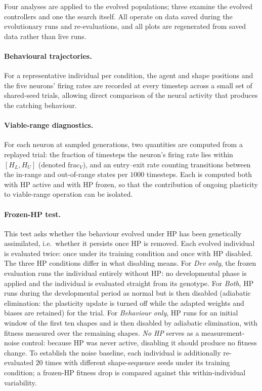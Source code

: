 Four analyses are applied to the evolved populations; three examine the evolved
controllers and one the search itself. All operate on data saved during the
evolutionary runs and re-evaluations, and all plots are regenerated from saved
data rather than live runs.

\paragraph{Behavioural trajectories.}
For a representative individual per condition, the agent and shape positions and
the five neurons' firing rates are recorded at every timestep across a small set
of shared-seed trials, allowing direct comparison of the neural activity that
produces the catching behaviour.

\paragraph{Viable-range diagnostics.}
For each neuron at sampled generations, two quantities are computed from a
replayed trial: the fraction of timesteps the neuron's firing rate lies within
$[H_L, H_U]$ (denoted $\mathrm{frac}_V$), and an entry--exit rate counting
transitions between the in-range and out-of-range states per $1000$ timesteps.
Each is computed both with HP active and with HP frozen, so that the
contribution of ongoing plasticity to viable-range operation can be isolated.

\paragraph{Frozen-HP test.}
This test asks whether the behaviour evolved under HP has been genetically
assimilated, i.e.\ whether it persists once HP is removed. Each evolved
individual is evaluated twice: once under its training condition and once with HP
disabled. The three HP conditions differ in what disabling means. For
\emph{Dev only}, the frozen evaluation runs the individual entirely without HP:
no developmental phase is applied and the individual is evaluated straight from
its genotype. For \emph{Both}, HP runs during the developmental period as normal
but is then disabled (adiabatic elimination: the plasticity update is turned off
while the adapted weights and biases are retained) for the trial. For
\emph{Behaviour only}, HP runs for an initial window of the first ten shapes and
is then disabled by adiabatic elimination, with fitness measured over the
remaining shapes. \emph{No HP} serves as a measurement-noise control: because HP
was never active, disabling it should produce no fitness change. To establish the
noise baseline, each individual is additionally re-evaluated $20$ times with
different shape-sequence seeds under its training condition; a frozen-HP fitness
drop is compared against this within-individual variability.

